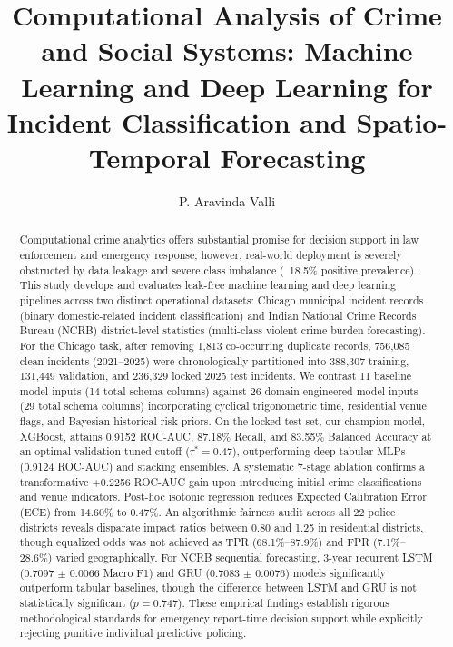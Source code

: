 \documentclass[runningheads]{llncs}
\begin{document}
\title{Computational Analysis of Crime and Social Systems: Machine Learning and Deep Learning for Incident Classification and Spatio-Temporal Forecasting}

\author{P. Aravinda Valli}

\maketitle

\begin{abstract}
Computational crime analytics offers substantial promise for decision support in law enforcement and emergency response; however, real-world deployment is severely obstructed by data leakage and severe class imbalance (~18.5\% positive prevalence). This study develops and evaluates leak-free machine learning and deep learning pipelines across two distinct operational datasets: Chicago municipal incident records (binary domestic-related incident classification) and Indian National Crime Records Bureau (NCRB) district-level statistics (multi-class violent crime burden forecasting). For the Chicago task, after removing 1,813 co-occurring duplicate records, 756,085 clean incidents (2021--2025) were chronologically partitioned into 388,307 training, 131,449 validation, and 236,329 locked 2025 test incidents. We contrast 11 baseline model inputs (14 total schema columns) against 26 domain-engineered model inputs (29 total schema columns) incorporating cyclical trigonometric time, residential venue flags, and Bayesian historical risk priors. On the locked test set, our champion model, XGBoost, attains 0.9152 ROC-AUC, 87.18\% Recall, and 83.55\% Balanced Accuracy at an optimal validation-tuned cutoff ($\tau^* = 0.47$), outperforming deep tabular MLPs (0.9124 ROC-AUC) and stacking ensembles. A systematic 7-stage ablation confirms a transformative +0.2256 ROC-AUC gain upon introducing initial crime classifications and venue indicators. Post-hoc isotonic regression reduces Expected Calibration Error (ECE) from 14.60\% to 0.47\%. An algorithmic fairness audit across all 22 police districts reveals disparate impact ratios between 0.80 and 1.25 in residential districts, though equalized odds was not achieved as TPR (68.1\%--87.9\%) and FPR (7.1\%--28.6\%) varied geographically. For NCRB sequential forecasting, 3-year recurrent LSTM (0.7097 $\pm$ 0.0066 Macro F1) and GRU (0.7083 $\pm$ 0.0076) models significantly outperform tabular baselines, though the difference between LSTM and GRU is not statistically significant ($p = 0.747$). These empirical findings establish rigorous methodological standards for emergency report-time decision support while explicitly rejecting punitive individual predictive policing.

\end{abstract}
\end{document}
